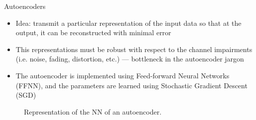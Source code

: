 \documentclass[english,aspectratio=1610,9pt,helvet,nicetitles]{ICEbeamerTUMCD}
\begin{document}
\begin{frame}{Autoencoders}
\begin{itemize}
\item Idea: transmit a particular representation of the input data so that at the output, it can be reconstructed with minimal error
\item This representations must be robust with respect to the channel impairments (i.e. noise, fading, distortion, etc.) --- bottleneck in the autoencoder jargon
\item The autoencoder is implemented using Feed-forward Neural Networks (FFNN), and the parameters are learned using Stochastic Gradient Descent (SGD)
\end{itemize}
\vspace{-5mm}
\begin{figure}
\centering
\resizebox{!}{11em}{

}
\caption{Representation of the NN of an autoencoder.}
\label{fig:autoencoder}
\end{figure}

\end{frame}
\end{document}
